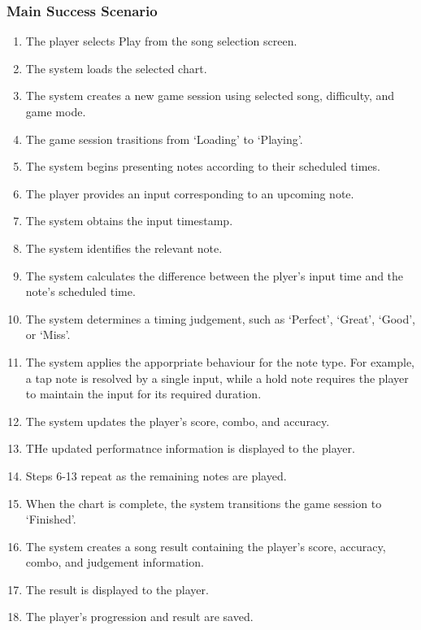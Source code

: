 \documentclass[12pt,a4paper]{article}
\begin{document}
            \subsubsection{Main Success Scenario}
                \begin{enumerate}
                    \item The player selects Play from the song selection screen.
                    \item The system loads the selected chart.
                    \item The system creates a new game session using selected song, difficulty, and game mode.
                    \item The game session trasitions from `Loading' to `Playing'.
                    \item The system begins presenting notes according to their scheduled times.
                    \item The player provides an input corresponding to an upcoming note.
                    \item The system obtains the input timestamp.
                    \item The system identifies the relevant note.
                    \item The system calculates the difference between the plyer's input time and the note's scheduled time.
                    \item The system determines a timing judgement, such as `Perfect', `Great', `Good', or `Miss'.
                    \item The system applies the apporpriate behaviour for the note type. For example, a tap note is resolved by a single input, while a hold note requires the player to maintain the input for its required duration.
                    \item The system updates the player's score, combo, and accuracy.
                    \item THe updated performatnce information is displayed to the player.
                    \item Steps 6-13 repeat as the remaining notes are played.
                    \item When the chart is complete, the system transitions the game session to `Finished'.
                    \item The system creates a song result containing the player's score, accuracy, combo, and judgement information.
                    \item The result is displayed to the player.
                    \item The player's progression and result are saved.
                \end{enumerate}
            
\end{document}
